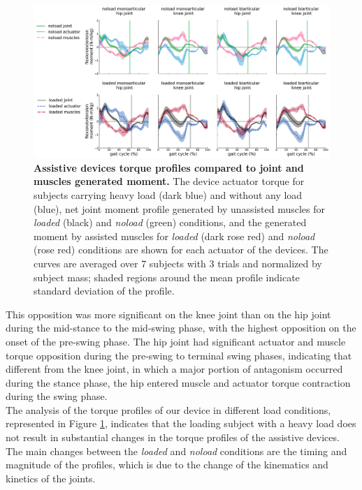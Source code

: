 \documentclass[10pt,letterpaper]{article}
\begin{document}
\begin{figure}[ht]   
	\centering
	\includegraphics[width=\linewidth]{Ideal_Exo_MonovsBi_Figures/PaperFigure_Exoskeletons_Torque.pdf}
	\vspace{1mm}
	\caption{{\small\textbf{Assistive devices torque profiles compared to joint and muscles generated moment.} The device actuator torque for subjects carrying heavy load (dark blue) and without any load (blue), net joint moment profile generated by unassisted muscles for \textit{loaded} (black) and \textit{noload} (green) conditions, and the generated moment by assisted muscles for \textit{loaded} (dark rose red) and \textit{noload} (rose red) conditions are shown for each actuator of the devices. The curves are averaged over 7 subjects with 3 trials and normalized by subject mass; shaded regions around the mean profile indicate standard deviation of the profile.}}
	\label{Fig_IdealExo_Torque}
\end{figure}
This opposition was more significant on the knee joint than on the hip joint during the mid-stance to the mid-swing phase, with the highest opposition on the onset of the pre-swing phase. The hip joint had significant actuator and muscle torque opposition during the pre-swing to terminal swing phases, indicating that different from the knee joint, in which a major portion of antagonism occurred during the stance phase, the hip entered muscle and actuator torque contraction during the swing phase. \\
The analysis of the torque profiles of our device in different load conditions, represented in Figure \ref{Fig_IdealExo_Torque}, indicates that the loading subject with a heavy load does not result in substantial changes in the torque profiles of the assistive devices. The main changes between the \textit{loaded} and \textit{noload} conditions are the timing and magnitude of the profiles, which is due to the change of the  kinematics and kinetics of the joints.
\end{document}
